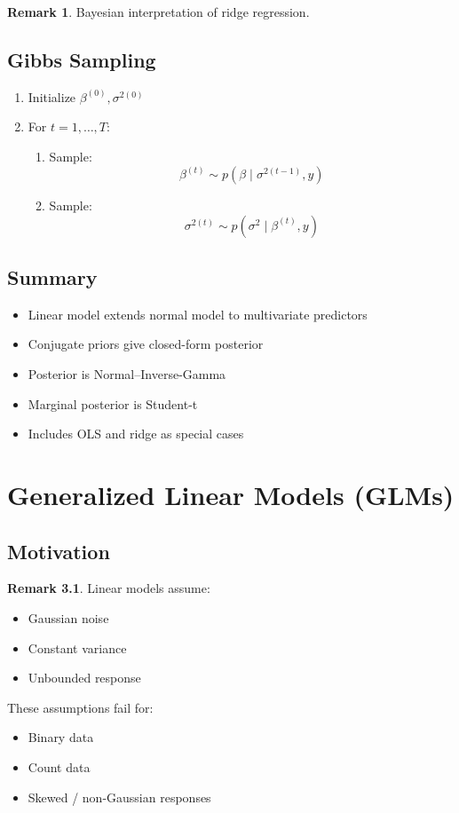 \documentclass[12pt,oneside]{book}
\numberwithin{equation}{section}
\theoremstyle{definition}
\newtheorem{remark}{Remark}[section]
\theoremstyle{plain}
\theoremstyle{remark}
\begin{document}
\begin{remark}
Bayesian interpretation of ridge regression.
\end{remark}

\section{Gibbs Sampling}

\begin{algorithm}
\begin{enumerate}
\item Initialize $\beta^{(0)}, \sigma^{2(0)}$
\item For $t = 1, \dots, T$:
\begin{enumerate}
\item Sample:
$$
\beta^{(t)} \sim p(\beta \mid \sigma^{2(t-1)}, y)
$$
\item Sample:
$$
\sigma^{2(t)} \sim p(\sigma^2 \mid \beta^{(t)}, y)
$$
\end{enumerate}
\end{enumerate}
\end{algorithm}

\section{Summary}

\begin{itemize}
\item Linear model extends normal model to multivariate predictors
\item Conjugate priors give closed-form posterior
\item Posterior is Normal–Inverse-Gamma
\item Marginal posterior is Student-t
\item Includes OLS and ridge as special cases
\end{itemize}

\chapter{Generalized Linear Models (GLMs)}

\section{Motivation}

\begin{remark}
Linear models assume:
\begin{itemize}
\item Gaussian noise
\item Constant variance
\item Unbounded response
\end{itemize}

These assumptions fail for:
\begin{itemize}
\item Binary data
\item Count data
\item Skewed / non-Gaussian responses
\end{itemize}
\end{remark}
\end{document}

